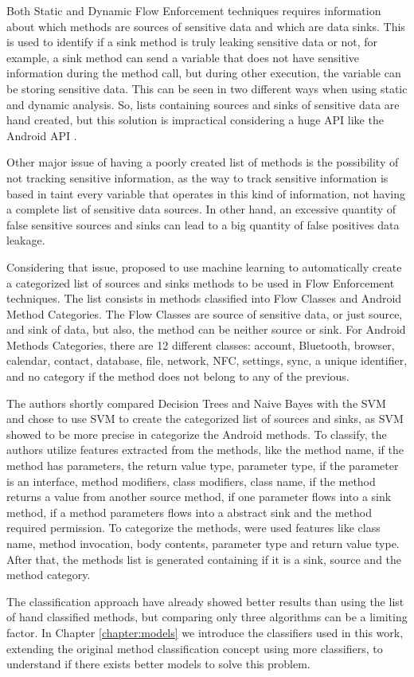 Both Static and Dynamic Flow Enforcement techniques requires information about which methods are sources of sensitive data and which are data sinks. This is used to identify if a sink method is truly leaking sensitive data or not, for example, a sink method can send a variable that does not have sensitive information during the method call, but during other execution, the variable can be storing sensitive data. This can be seen in two different ways when using static and dynamic analysis. So, lists containing sources and sinks of sensitive data are hand created, but this solution is impractical considering a huge API like the Android API \citep{rasthofer2014machine}.

Other major issue of having a poorly created list of methods is the possibility of not tracking sensitive information, as the way to track sensitive information is based in taint every variable that operates in this kind of information, not having a complete list of sensitive data sources. In other hand, an excessive quantity of false sensitive sources and sinks can lead to a big quantity of false positives data leakage. 

Considering that issue, \cite{rasthofer2014machine} proposed to use machine learning to automatically create a categorized list of sources and sinks methods to be used in Flow Enforcement techniques. The list consists in methods classified into Flow Classes and Android Method Categories. The Flow Classes are source of sensitive data, or just source, and sink of data, but also, the method can be neither source or sink. For Android Methods Categories, there are 12 different classes: account, Bluetooth, browser, calendar, contact, database, file, network, NFC, settings, sync, a unique identifier, and no category if the method does not belong to any of the previous.

The authors shortly compared Decision Trees and Naive Bayes with the SVM and chose to use SVM to create the categorized list of sources and sinks, as SVM showed to be more precise in categorize the Android methods. To classify, the authors utilize features extracted from the methods, like the method name, if the method has parameters, the return value type, parameter type, if the parameter is an interface, method modifiers, class modifiers, class name, if the method returns a value from another source method, if one parameter flows into a sink method, if a method parameters flows into a abstract sink and the method required permission. To categorize the methods, were used features like class name, method invocation, body contents, parameter type and return value type. After that, the methods list is generated containing if it is a sink, source and the method category.

The classification approach have already showed better results than using the list of hand classified methods, but comparing only three algorithms can be a limiting factor. In Chapter \ref{chapter:models} we introduce the classifiers used in this work, extending the original method classification concept using more classifiers, to understand if there exists better models to solve this problem.
